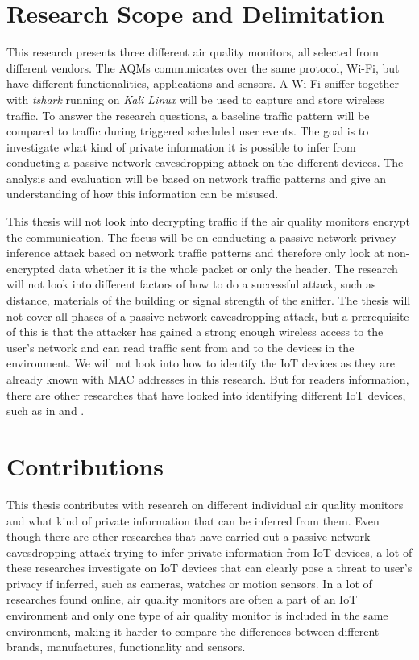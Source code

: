 \section{Research Scope and Delimitation}
This research presents three different air quality monitors, all selected from different vendors. The \gls{AQM}s communicates over the same protocol, \gls{Wi-Fi}, but have different functionalities, applications and sensors. A \gls{Wi-Fi} sniffer together with \textit{tshark} running on \textit{Kali Linux} will be used to capture and store wireless traffic. To answer the research questions, a baseline traffic pattern will be compared to traffic during triggered scheduled user events. The goal is to investigate what kind of private information it is possible to infer from conducting a passive network eavesdropping attack on the different devices. The analysis and evaluation will be based on network traffic patterns and give an understanding of how this information can be misused. 

This thesis will not look into decrypting traffic if the air quality monitors encrypt the communication. The focus will be on conducting a passive network privacy inference attack based on network traffic patterns and therefore only look at non-encrypted data whether it is the whole packet or only the header. The research will not look into different factors of how to do a successful attack, such as distance, materials of the building or signal strength of the sniffer. The thesis will not cover all phases of a passive network eavesdropping attack, but a prerequisite of this is that the attacker has gained a strong enough wireless access to the user's network and can read traffic sent from and to the devices in the environment. We will not look into how to identify the \gls{IoT} devices as they are already known with \gls{MAC} addresses in this research. But for readers information, there are other researches that have looked into identifying different \gls{IoT} devices, such as in \cite{IdentifyIoT1} and \cite{IdentifyingIoT2}. 

\section{Contributions}
This thesis contributes with research on different individual air quality monitors and what kind of private information that can be inferred from them. Even though there are other researches that have carried out a passive network eavesdropping attack trying to infer private information from \gls{IoT} devices, a lot of these researches investigate on \gls{IoT} devices that can clearly pose a threat to user's privacy if inferred, such as cameras, watches or motion sensors. In a lot of researches found online, air quality monitors are often a part of an \gls{IoT} environment and only one type of air quality monitor is included in the same environment, making it harder to compare the differences between different brands, manufactures, functionality and sensors. 

